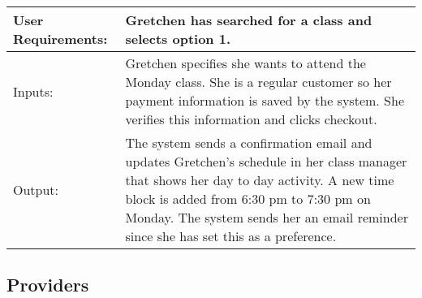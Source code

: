 \documentclass[12pt]{article}
\begin{document}
\begin{enumerate}
\begin{tabular}{| m{4cm} | m{11cm} |}
\hline
User Requirements: & Gretchen has searched for a class and selects option 1.\\
\hline
Inputs: & Gretchen specifies she wants to attend the Monday class.
She is a regular customer so her payment information is saved by the system. She verifies this information and clicks checkout.\\
\hline
Output: & The system sends a confirmation email and updates Gretchen’s schedule in her class manager that shows her day to day activity. A new time block is added from 6:30 pm to 7:30 pm on Monday.  The system sends her an email reminder since she has set this as a preference.
\\
\hline
\end{tabular}
\end{enumerate}

\subsection{Providers}
\end{document}
